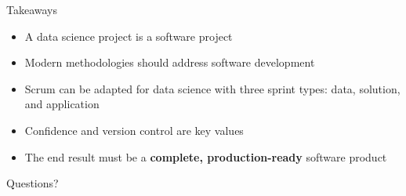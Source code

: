 
\begin{frame}{Takeaways}
  \begin{itemize}
    \item A data science project is a software project
    \item Modern methodologies should address software development
    \item Scrum can be adapted for data science with three sprint types:
      data, solution, and application
    \item Confidence and version control are key values
    \item The end result must be a \textbf{complete, production-ready} software product
  \end{itemize}
\end{frame}


\begin{frame}[standout]
  Questions?
\end{frame}


